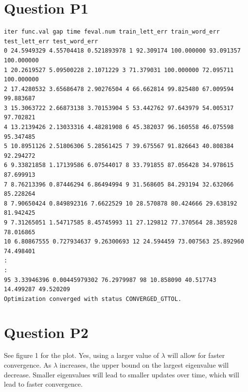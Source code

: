 \documentclass[11pt]{report}
\begin{document}
\maketitle

\section*{Question P1}
\begin{verbatim}
iter func.val gap time feval.num train_lett_err train_word_err test_lett_err test_word_err
0 24.5949329 4.55704418 0.521893978 1 92.309174 100.000000 93.091357 100.000000
1 20.2619527 5.09500228 2.1071229 3 71.379031 100.000000 72.095711 100.000000
2 17.4280532 3.65686478 2.90276504 4 66.662814 99.825480 67.009594 99.883687
3 15.3063722 2.66873138 3.70153904 5 53.442762 97.643979 54.005317 97.702821
4 13.2139426 2.13033316 4.48281908 6 45.382037 96.160558 46.075598 95.347485
5 10.8951126 2.51806306 5.28561425 7 39.675567 91.826643 40.808384 92.294272
6 9.33821858 1.17139586 6.07544017 8 33.791855 87.056428 34.978615 87.699913
7 8.76213396 0.87446294 6.86494994 9 31.568605 84.293194 32.632066 85.228264
8 7.90650424 0.849892316 7.6622529 10 28.570878 80.424666 29.638192 81.942425
9 7.31265051 1.54717585 8.45745993 11 27.129812 77.370564 28.385928 78.016865
10 6.80867555 0.727934637 9.26300693 12 24.594459 73.007563 25.892960 74.498401
:
:
95 3.33946396 0.00445979302 76.2979987 98 10.858090 40.517743 14.499287 49.520209
Optimization converged with status CONVERGED_GTTOL.
\end{verbatim}

\section*{Question P2}
See figure 1 for the plot. Yes, using a larger value of $\lambda$
will allow for faster convergence. As $\lambda$ increases, the upper bound
on the largest eigenvalue will decrease. Smaller eigenvalues will lead
to smaller updates over time, which will lead to faster convergence.
\end{document}
